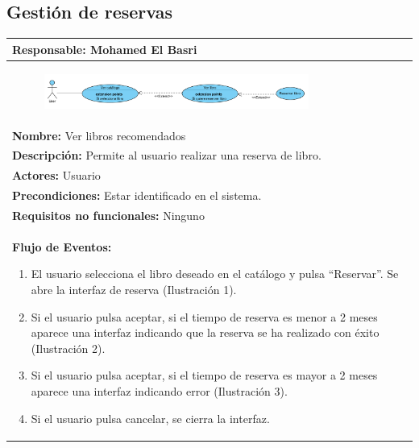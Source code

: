 \documentclass{report}
\begin{document}
        \subsection{Gestión de reservas}
            \begin{center}
                \begin{longtable}{|p{\linewidth}|}
                    \hline
                    \textbf{Responsable:} Mohamed El Basri\\
                    \hline
                    \begin{figure}[H]
                        \centering
                        \includegraphics[width=0.8\textwidth]{./img/casos_uso/CasoDeUso_GestionDeReservas.PNG}
                    \end{figure}\\
                    \hline
                    \textbf{Nombre:} Ver libros recomendados\\
                    \hline
                    \textbf{Descripción:} Permite al usuario realizar una reserva de libro.\\
                    \hline
                    \textbf{Actores:} Usuario\\
                    \hline
                    \textbf{Precondiciones:} Estar identificado en el sistema.\\
                    \hline
                    \textbf{Requisitos no funcionales:} Ninguno\\
                    \hline
                    \textbf{Flujo de Eventos:}
                    \begin{enumerate}
                        \item El usuario selecciona el libro deseado en el catálogo y pulsa “Reservar”. Se abre la interfaz de reserva (Ilustración 1).
                        \item Si el usuario pulsa aceptar, si el tiempo de reserva es menor a 2 meses aparece una interfaz indicando que la reserva se ha realizado con éxito (Ilustración 2).
                        \item Si el usuario pulsa aceptar, si el tiempo de reserva es mayor a 2 meses aparece una interfaz indicando error (Ilustración 3).
                        \item Si el usuario pulsa cancelar, se cierra la interfaz.

\end{enumerate}
\end{longtable}
\end{center}
\end{document}
